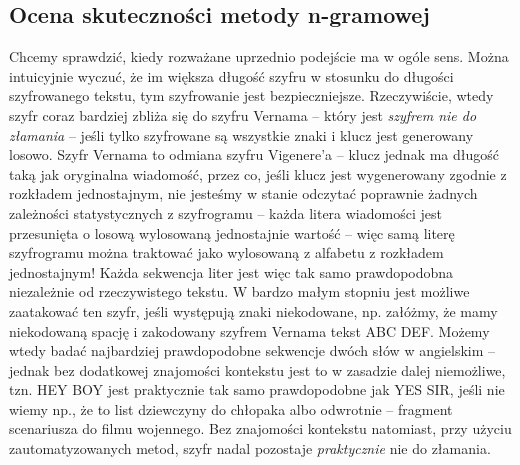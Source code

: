 \documentclass[a4paper]{article}
\begin{document}
\subsection{Ocena skuteczności metody n-gramowej}
Chcemy sprawdzić, kiedy rozważane uprzednio podejście ma w ogóle sens. Można intuicyjnie wyczuć, że im większa długość szyfru w stosunku do długości szyfrowanego tekstu, tym szyfrowanie jest bezpieczniejsze. Rzeczywiście, wtedy szyfr coraz bardziej zbliża się do szyfru Vernama – który jest \textit{szyfrem nie do złamania} – jeśli tylko szyfrowane są wszystkie znaki i klucz jest generowany losowo. Szyfr Vernama to odmiana szyfru Vigenere'a – klucz jednak ma długość taką jak oryginalna wiadomość, przez co, jeśli klucz jest wygenerowany zgodnie z rozkładem jednostajnym, nie jesteśmy w stanie odczytać poprawnie żadnych zależności statystycznych z szyfrogramu – każda litera wiadomości jest przesunięta o losową wylosowaną jednostajnie wartość – więc samą literę szyfrogramu można traktować jako wylosowaną z alfabetu z rozkładem jednostajnym! Każda sekwencja liter jest więc tak samo prawdopodobna niezależnie od rzeczywistego tekstu. W bardzo małym stopniu jest możliwe zaatakować ten szyfr, jeśli występują znaki niekodowane, np. załóżmy, że mamy niekodowaną spację i zakodowany szyfrem Vernama tekst ABC DEF. Możemy wtedy badać najbardziej prawdopodobne sekwencje dwóch słów w angielskim – jednak bez dodatkowej znajomości kontekstu jest to w zasadzie dalej niemożliwe, tzn. HEY BOY jest praktycznie tak samo prawdopodobne jak YES SIR, jeśli nie wiemy np., że to list dziewczyny do chłopaka albo odwrotnie – fragment scenariusza do filmu wojennego. Bez znajomości kontekstu natomiast, przy użyciu zautomatyzowanych metod, szyfr nadal pozostaje \textit{praktycznie} nie do złamania.\\
\end{document}

